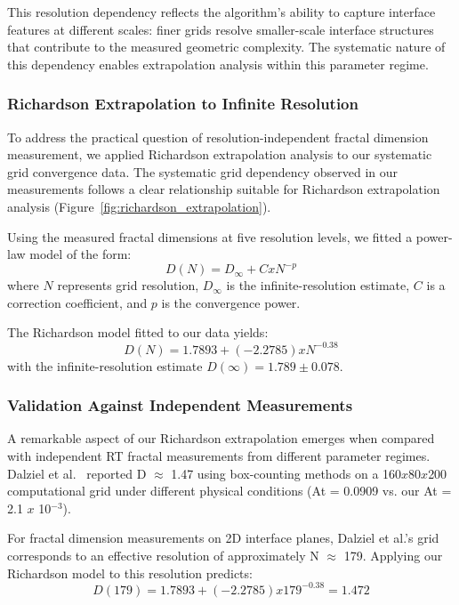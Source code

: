 \documentclass[preprint,12pt]{elsarticle}
\def\times{x}%
\begin{document}
This resolution dependency reflects the algorithm's ability to capture interface features at different scales: finer grids resolve smaller-scale interface structures that contribute to the measured geometric complexity. The systematic nature of this dependency enables extrapolation analysis within this parameter regime.

\subsubsection{Richardson Extrapolation to Infinite Resolution}

To address the practical question of resolution-independent fractal dimension measurement, we applied Richardson extrapolation analysis to our systematic grid convergence data. The systematic grid dependency observed in our measurements follows a clear relationship suitable for Richardson extrapolation analysis (Figure~\ref{fig:richardson_extrapolation}).

Using the measured fractal dimensions at five resolution levels, we fitted a power-law model of the form:
\begin{equation}
D(N) = D_{\infty} + C \times N^{-p}
\label{eq:richardson_model}
\end{equation}
where $N$ represents grid resolution, $D_{\infty}$ is the infinite-resolution estimate, $C$ is a correction coefficient, and $p$ is the convergence power.

The Richardson model fitted to our data yields:
\begin{equation}
D(N) = 1.7893 + (-2.2785) \times N^{-0.38}
\label{eq:richardson_fitted}
\end{equation}
with the infinite-resolution estimate $D(\infty) = 1.789 \pm 0.078$.

\subsubsection{Validation Against Independent Measurements}

A remarkable aspect of our Richardson extrapolation emerges when compared with independent RT fractal measurements from different parameter regimes. Dalziel et al.~\cite{dalziel1999} reported D $\approx$ 1.47 using box-counting methods on a 160$\times$80$\times$200 computational grid under different physical conditions (At = 0.0909 vs. our At = 2.1 $\times$ 10$^{-3}$).

For fractal dimension measurements on 2D interface planes, Dalziel et al.'s grid corresponds to an effective resolution of approximately N $\approx$ 179. Applying our Richardson model to this resolution predicts:
\begin{equation}
D(179) = 1.7893 + (-2.2785) \times 179^{-0.38} = 1.472
\label{eq:dalziel_prediction}
\end{equation}
\end{document}

